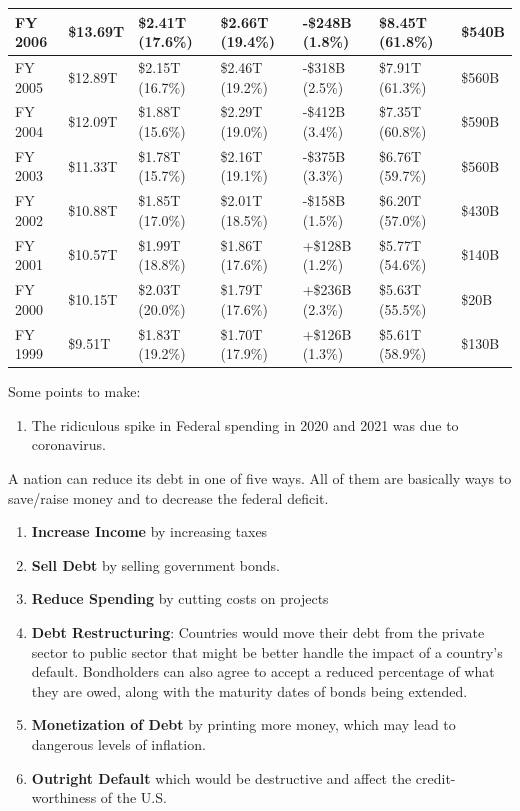\documentclass{article}
\begin{document}
\begin{table}[H]
\begin{tabular}{|l|l|l|l|l|l|l|}
      FY 2006 & \$13.69T & \$2.41T (17.6\%) & \$2.66T (19.4\%) & -\$248B (1.8\%) & \$8.45T (61.8\%) & \$540B \\ \hline
      FY 2005 & \$12.89T & \$2.15T (16.7\%) & \$2.46T (19.2\%) & -\$318B (2.5\%) & \$7.91T (61.3\%) & \$560B \\ \hline
      FY 2004 & \$12.09T & \$1.88T (15.6\%) & \$2.29T (19.0\%) & -\$412B (3.4\%) & \$7.35T (60.8\%) & \$590B \\ \hline
      FY 2003 & \$11.33T & \$1.78T (15.7\%) & \$2.16T (19.1\%) & -\$375B (3.3\%) & \$6.76T (59.7\%) & \$560B \\ \hline
      FY 2002 & \$10.88T & \$1.85T (17.0\%) & \$2.01T (18.5\%) & -\$158B (1.5\%) & \$6.20T (57.0\%) & \$430B \\ \hline
      FY 2001 & \$10.57T & \$1.99T (18.8\%) & \$1.86T (17.6\%) & +\$128B (1.2\%) & \$5.77T (54.6\%) & \$140B \\ \hline
      FY 2000 & \$10.15T & \$2.03T (20.0\%) & \$1.79T (17.6\%) & +\$236B (2.3\%) & \$5.63T (55.5\%) & \$20B \\ \hline
      FY 1999 & \$9.51T & \$1.83T (19.2\%) & \$1.70T (17.9\%) & +\$126B (1.3\%) & \$5.61T (58.9\%) & \$130B \\ \hline
      \end{tabular}
    \end{table}

    Some points to make:

    \begin{enumerate}
      \item The ridiculous spike in Federal spending in 2020 and 2021 was due to coronavirus.
    \end{enumerate}

    A nation can reduce its debt in one of five ways. All of them are basically ways to save/raise money and to decrease the federal deficit. 
    \begin{enumerate}
      \item \textbf{Increase Income} by increasing taxes
      \item \textbf{Sell Debt} by selling government bonds.  
      \item \textbf{Reduce Spending} by cutting costs on projects
      \item \textbf{Debt Restructuring}: Countries would move their debt from the private sector to public sector that might be better handle the impact of a country's default. Bondholders can also agree to accept a reduced percentage of what they are owed, along with the maturity dates of bonds being extended.
      \item \textbf{Monetization of Debt} by printing more money, which may lead to dangerous levels of inflation.
      \item \textbf{Outright Default} which would be destructive and affect the credit-worthiness of the U.S.
    \end{enumerate}
\end{document}
